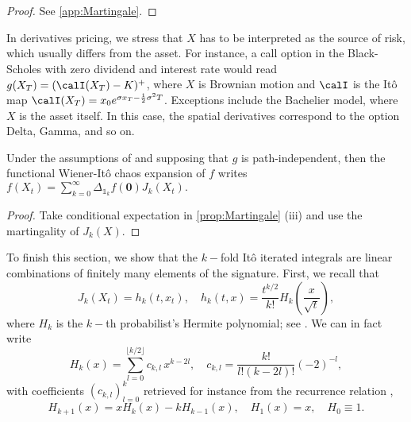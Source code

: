 \begin{proof}
See \cref{app:Martingale}.
\end{proof}

In derivatives pricing, we stress  that $X$ has to be interpreted as the source of risk, which usually differs from the asset.  
For instance, a call option in the Black-Scholes with zero dividend and interest rate would read $g(X_T) = (\calI(X_T) -K)^+$, where $X$ is Brownian motion and $\calI$ is  the  It\^o map $\calI(X_T) = x_0 e^{\sigma x_T - \frac{1}{2}\sigma^2T}$.
Exceptions include the Bachelier model, where $X$  is the asset itself. In this case, the spatial derivatives correspond to the option Delta, Gamma, and so on.


\begin{corollary}
Under the assumptions of   and supposing that $g$ is path-independent, then the functional Wiener-Itô chaos expansion of $f$ writes
$f(X_t) = \sum_{k=0}^{\infty}\Delta_{\mathds{1}_k}f(\boldsymbol{0}) J_k(X_t).$
\end{corollary}

\begin{proof}
Take conditional expectation in  \cref{prop:Martingale} (iii) and use the martingality of $J_k(X)$. 
\end{proof}

To finish this section, we show that the $k-$fold It\^o iterated integrals are linear combinations of finitely many elements of the signature.  %
First, we recall that 
 \begin{equation}\label{eq:Hermite}
    J_{k}(X_t) = h_k(t,x_t), \quad  h_k(t,x) =  \frac{t^{k/2}}{k!}H_k\left(\frac{x}{\sqrt{t}}\right),  
 \end{equation}
where $H_k$ is the $k-$th probabilist's Hermite polynomial; see  \cite{DiNunno}. We can in fact write \begin{equation}\label{eq:exHermite}
H_k(x) = \sum_{l=0}^{\lfloor k/2 \rfloor} c_{k,l} \, x^{k-2l}, \quad c_{k,l} = \frac{k!}{l! (k-2l)!} (-2)^{-l}, 
\end{equation}
with coefficients $(c_{k,l})_{l=0}^k$ retrieved  for instance from   the recurrence relation \cite[Section 5.4]{Szego},
\begin{equation*}%
    H_{k+1}(x) = xH_{k}(x) - kH_{k-1}(x),\quad   H_1(x)=x, \quad H_0\equiv 1.
\end{equation*}

